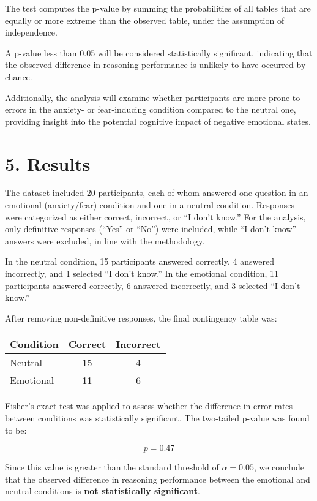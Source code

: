 \documentclass[12pt]{article}
\begin{document}
The test computes the p-value by summing the probabilities of all tables that are equally or more extreme than the observed table, under the assumption of independence.

A p-value less than 0.05 will be considered statistically significant, indicating that the observed difference in reasoning performance is unlikely to have occurred by chance.

Additionally, the analysis will examine whether participants are more prone to errors in the anxiety- or fear-inducing condition compared to the neutral one, providing insight into the potential cognitive impact of negative emotional states.
\section*{5. Results}

The dataset included 20 participants, each of whom answered one question in an emotional (anxiety/fear) condition and one in a neutral condition. Responses were categorized as either correct, incorrect, or “I don’t know.” For the analysis, only definitive responses (“Yes” or “No”) were included, while “I don’t know” answers were excluded, in line with the methodology.

In the neutral condition, 15 participants answered correctly, 4 answered incorrectly, and 1 selected “I don’t know.” In the emotional condition, 11 participants answered correctly, 6 answered incorrectly, and 3 selected “I don’t know.”

After removing non-definitive responses, the final contingency table was:

\begin{center}
\begin{tabular}{lcc}
\textbf{Condition} & \textbf{Correct} & \textbf{Incorrect} \\
\hline
Neutral & 15 & 4 \\
Emotional & 11 & 6 \\
\end{tabular}
\end{center}

Fisher’s exact test was applied to assess whether the difference in error rates between conditions was statistically significant. The two-tailed p-value was found to be:

\[
p = 0.47
\]

Since this value is greater than the standard threshold of $\alpha = 0.05$, we conclude that the observed difference in reasoning performance between the emotional and neutral conditions is \textbf{not statistically significant}.
\end{document}
